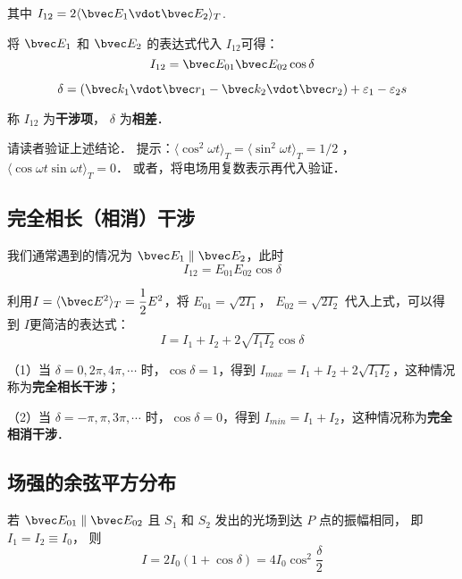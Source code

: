 其中 $ I _{12} =2 \langle \bvec E_1 \vdot \bvec E_2 \rangle _T$.

将 $\bvec E_1$ 和 $ \bvec E_2$ 的表达式代入 $I_{12}$可得：
\begin{equation}
I_{12} = \bvec E_{01}\bvec E_{02} \cos\delta
\end{equation}

\begin{equation}
\delta = (\bvec k_1 \vdot \bvec r_1 - \bvec k_2 \vdot \bvec r_2 ) + \varepsilon_1 - \varepsilon_2 s
\end{equation}

称 $ I_{12} $ 为\textbf{干涉项}， $ \delta $ 为\textbf{相差}．
\begin{exercise}{}
请读者验证上述结论． 提示：$\langle \cos ^2 \omega t \rangle _T = \langle \sin ^2 \omega t \rangle _T = 1/2 $ ， $ \langle \cos \omega t \sin \omega t \rangle_T =0 $． 或者，将电场用复数表示再代入验证．
\end{exercise}

\subsection{完全相长（相消）干涉}
我们通常遇到的情况为 $\bvec E_1 \parallel \bvec E_2$，此时
\begin{equation}
 I_{12} = E_{01} E_{02}\cos\delta
\end{equation}

利用$ I = \langle \bvec E^2 \rangle _T = \dfrac{1}{2}E^2$，将 $ E_{ 01} = \sqrt{2I_1}$， $ E_{ 02} = \sqrt{2I_2}$  代入上式，可以得到 $ I $更简洁的表达式：
\begin{equation}
 I = I_1 + I_2 + 2\sqrt{I_1 I_2}\cos\delta
\end{equation}

（1）当 $\delta = 0, 2\pi, 4\pi, \cdots$ 时，$\cos \delta = 1$，得到 $ I_{max} = I_1 + I_2 +2\sqrt{I_1 I_2}$，这种情况称为\textbf{完全相长干涉}；

（2）当 $\delta = -\pi, \pi, 3\pi, \cdots$ 时，$\cos \delta = 0$，得到 $ I_{min} = I_1 + I_2 $，这种情况称为\textbf{完全相消干涉}．

\subsection{场强的余弦平方分布}

若 $ \bvec E_{01} \parallel \bvec E_{02} $ 且 $S_1$ 和 $S_2$ 发出的光场到达 $ P $ 点的振幅相同， 即 $ I_1 = I_2 \equiv I_0 $， 则
\begin{equation}
 I = 2 I_0 ( 1 + \cos\delta ) = 4 I_0 \cos ^2\dfrac { \delta } { 2 } 
\end{equation}

